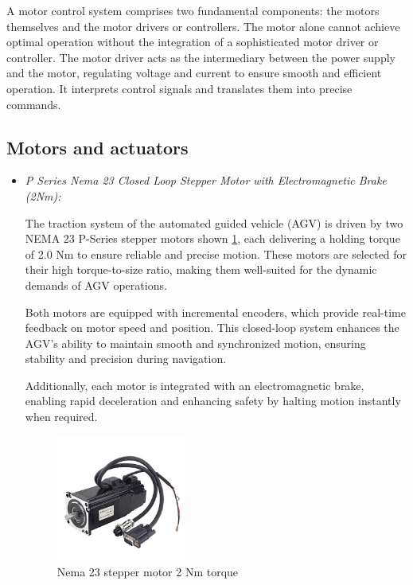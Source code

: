 \documentclass[../../main]{subfiles}
\begin{document}
A motor control system comprises two fundamental components: the motors themselves and the motor drivers or controllers. 
The motor alone cannot achieve optimal operation without the integration of a sophisticated motor driver or controller. 
The motor driver acts as the intermediary between the power supply and the motor, regulating voltage and current to ensure 
smooth and efficient operation. It interprets control signals and translates them into precise commands.

\subsection{Motors and actuators}

\begin{itemize}
    \item \textit{P Series Nema 23 Closed Loop Stepper Motor with Electromagnetic
    Brake (2Nm):}

The traction system of the automated guided vehicle (AGV)  
is driven by two NEMA 23 P-Series stepper motors shown \cref{Nema 23 stepper motor},  
each delivering a holding torque of 2.0 Nm to ensure  
reliable and precise motion. These motors are selected  
for their high torque-to-size ratio, making them well-suited  
for the dynamic demands of AGV operations.  

Both motors are equipped with incremental encoders, which provide real-time feedback  
on motor speed and position. This closed-loop system  
enhances the AGV's ability to maintain smooth and synchronized  
motion, ensuring stability and precision during navigation.  

Additionally, each motor is integrated with an electromagnetic  
brake, enabling rapid deceleration and enhancing safety  
by halting motion instantly when required. 

\begin{figure}[H]
\centering
\includegraphics[width=0.4\textwidth]{fig/nema_motor.png}
\caption{Nema 23 stepper motor 2 Nm torque }
\label{Nema 23 stepper motor} %
\end{figure}


\end{itemize}
\end{document}
